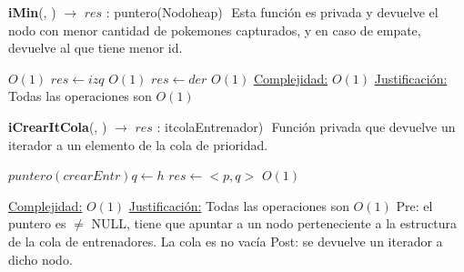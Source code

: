 \begin{Algoritmos}
\begin{algorithm}[H]{\textbf{iMin}(, ) $\to$ $res$ : puntero(Nodoheap)}  $ $\newline
\Comment Esta funci\'on es privada y devuelve el nodo con menor cantidad de pokemones capturados, y en caso de empate, devuelve al que tiene menor id.
    	\begin{algorithmic}[1] 
			  \Comment $O(1)$
			 	\State $res \gets izq$ \Comment $O(1)$
			 \Else
			 	\State $res \gets der$ \Comment $O(1)$
			 \EndIf		
			\medskip
			\Statex \underline{Complejidad:} $O(1)$
			\Statex \underline{Justificaci\'on:} Todas las operaciones son $O(1)$ 
    	\end{algorithmic}   	
\end{algorithm}

\begin{algorithm}[H]{\textbf{iCrearItCola}(, ) $\to$ $res$ : itcolaEntrenador)} $ $\newline
\Comment Funci\'on privada que devuelve un iterador a un elemento de la cola de prioridad.
    	\begin{algorithmic}[1]
    		 \State $puntero(crearEntr) q \gets h$
			 \State $res \gets  <p, q> $ \Comment $O(1)$

			\medskip
			\Statex \underline{Complejidad:} $O(1)$
			\Statex \underline{Justificaci\'on:} Todas las operaciones son $O(1)$
			Pre: el puntero es $\not=$ NULL, tiene que apuntar a un nodo perteneciente a la estructura de la cola de entrenadores. La cola es no vac\'ia Post: se devuelve un iterador a dicho nodo.
    	\end{algorithmic}
\end{algorithm}


\end{Algoritmos}